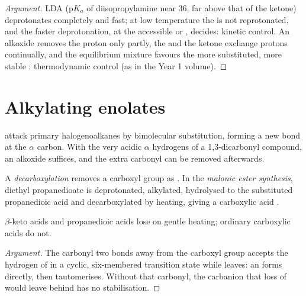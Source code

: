 \begin{proof}[Argument]
LDA ($\mathrm pK_a$ of diisopropylamine near 36, far above that of the ketone) deprotonates completely and
fast; at low temperature the  is not reprotonated, and the faster deprotonation, at the
accessible  or , decides: kinetic control. An alkoxide removes the proton only partly,
the  and the ketone exchange protons continually, and the equilibrium mixture favours the
more substituted, more stable : thermodynamic control (as in the Year 1 volume).
\end{proof}

\section{Alkylating enolates}

 attack primary halogenoalkanes by bimolecular substitution, forming a new  bond at
the $\alpha$ carbon. With the very acidic $\alpha$ hydrogens of a 1,3-dicarbonyl compound, an alkoxide
suffices, and the extra carbonyl can be removed afterwards.

\begin{definition}[Decarboxylation]\label{def:b2:enolates-aldol:decarboxylation}
A \emph{decarboxylation} removes a carboxyl group as . In the
\emph{malonic ester synthesis}, diethyl propanedioate is deprotonated,
alkylated, hydrolysed to the substituted propanedioic acid and decarboxylated by heating, giving a
carboxylic acid .
\end{definition}

\begin{proposition}\label{prop:b2:enolates-aldol:decarboxylation}
$\beta$-keto acids and propanedioic acids lose  on gentle heating; ordinary carboxylic acids
do not.
\end{proposition}

\begin{proof}[Argument]
The carbonyl two bonds away from the carboxyl group accepts the hydrogen of  in a cyclic,
six-membered transition state while  leaves: an  forms directly, then tautomerises. Without
that carbonyl, the carbanion that loss of  would leave behind has no stabilisation.
\end{proof}

